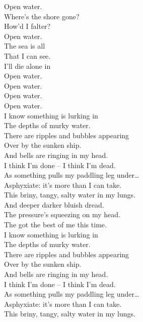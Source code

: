 Open water. \\
Where's the shore gone? \\
How'd I falter? \\
Open water. \\

The sea is all \\
That I can see. \\
I'll die alone in \\
Open water. \\

Open water. \\
Open water. \\
Open water. \\

I know something is lurking in \\
The depths of murky water. \\
There are ripples and bubbles appearing \\
Over by the sunken ship. \\

And bells are ringing in my head. \\
I think I'm done -- I think I'm dead. \\
As something pulls my paddling leg under… \\

Asphyxiate: it's more than I can take. \\
This briny, tangy, salty water in my lungs. \\

And deeper darker bluish dread. \\
The pressure's squeezing on my head. \\
The  got the best of me this time. \\

I know something is lurking in \\
The depths of murky water. \\
There are ripples and bubbles appearing \\
Over by the sunken ship. \\

And bells are ringing in my head. \\
I think I'm done -- I think I'm dead. \\
As something pulls my paddling leg under… \\

Asphyxiate: it's more than I can take. \\
This briny, tangy, salty water in my lungs. \\

